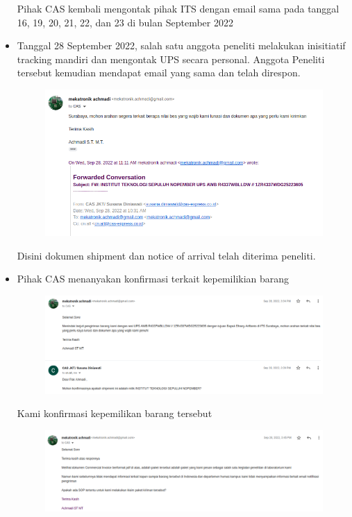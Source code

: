 \documentclass{article} %
\begin{document}
\begin{itemize}
		Pihak CAS kembali mengontak pihak ITS dengan email sama pada tanggal 16, 19, 20, 21, 22, dan 23 di bulan September 2022

		\newpage
		\item Tanggal 28 September 2022, salah satu anggota peneliti melakukan inisitiatif tracking mandiri dan mengontak UPS secara personal.
		Anggota Peneliti tersebut kemudian mendapat email yang sama dan telah direspon.

		\begin{figure}[!ht]
			\centering
			\includegraphics[width=400pt]{images/impor_3}
		\end{figure}

		Disini dokumen shipment dan notice of arrival telah diterima peneliti.

		\item Pihak CAS menanyakan konfirmasi terkait kepemilikian barang

		\begin{figure}[!ht]
			\centering
			\includegraphics[width=400pt]{images/impor_4}
		\end{figure}

		Kami konfirmasi kepemilikan barang tersebut

		\begin{figure}[!ht]
			\centering
			\includegraphics[width=400pt]{images/impor_5}
		\end{figure}


\end{itemize}
\end{document}
